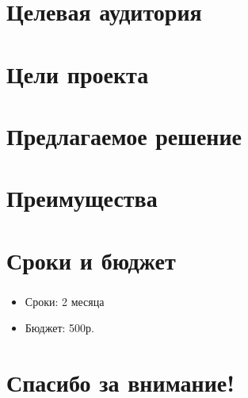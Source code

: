\documentclass[c]{beamer}  %
\begin{document}
\section{Целевая аудитория}

\begin{frame}
\frametitle{\insertsection} 
\framesubtitle{\insertsubsection}
\end{frame}


\section{Цели проекта}

\begin{frame}
\frametitle{\insertsection} 
\framesubtitle{\insertsubsection}
\end{frame}


\section{Предлагаемое решение}

\begin{frame}
\frametitle{\insertsection} 
\framesubtitle{\insertsubsection}
\end{frame}


\section{Преимущества}

\begin{frame}
\frametitle{\insertsection} 
\framesubtitle{\insertsubsection}
\end{frame}


\section{Сроки и бюджет}

\begin{frame}
\frametitle{\insertsection} 
\framesubtitle{\insertsubsection}
\begin{itemize}
    \item Сроки: 2 месяца
    \item Бюджет: 500р.
\end{itemize}
\end{frame}


\section{Спасибо за внимание!}

\begin{frame}
\end{frame}
\end{document}
